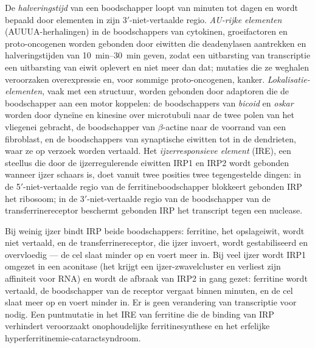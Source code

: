 \begin{definition}\label{def:b3:rna-regulation:stability}
De \emph{halveringstijd} van een boodschapper loopt van minuten tot
dagen en wordt bepaald door elementen in zijn 3$'$-niet-vertaalde
regio. \emph{AU-rijke elementen} (AUUUA-herhalingen) in de
boodschappers van cytokinen, groeifactoren en proto-oncogenen worden
gebonden door eiwitten die deadenylasen aantrekken en halveringstijden
van \qtyrange{10}{30}{min} geven, zodat een uitbarsting van
transcriptie een uitbarsting van eiwit oplevert en niet meer dan dat;
mutaties die ze weghalen veroorzaken overexpressie en, voor sommige
proto-oncogenen, kanker. \emph{Lokalisatie-elementen}, vaak met een
structuur, worden gebonden door adaptoren die de boodschapper aan een
motor koppelen: de boodschappers van \emph{bicoid} en \emph{oskar}
worden door dyneïne en kinesine over microtubuli naar de twee polen
van het vliegenei gebracht, de boodschapper van $\beta$-actine naar de
voorrand van een fibroblast, en de boodschappers van synaptische
eiwitten tot in de dendrieten, waar ze op verzoek worden vertaald. Het
\emph{ijzerresponsieve element} (IRE), een steellus die door de
ijzerregulerende eiwitten IRP1 en IRP2 wordt gebonden wanneer ijzer
schaars is, doet vanuit twee posities twee tegengestelde dingen: in de
5$'$-niet-vertaalde regio van de ferritineboodschapper blokkeert
gebonden IRP het ribosoom; in de 3$'$-niet-vertaalde regio van de
boodschapper van de transferrinereceptor beschermt gebonden IRP het
transcript tegen een nuclease.
\end{definition}

\begin{example}\label{ex:b3:rna-regulation:iron}
Bij weinig ijzer bindt IRP beide boodschappers: ferritine, het
opslageiwit, wordt niet vertaald, en de transferrinereceptor, die
ijzer invoert, wordt gestabiliseerd en overvloedig --- de cel slaat
minder op en voert meer in. Bij veel ijzer wordt IRP1 omgezet in een
aconitase (het krijgt een ijzer-zwavelcluster en verliest zijn
affiniteit voor RNA) en wordt de afbraak van IRP2 in gang gezet:
ferritine wordt vertaald, de boodschapper van de receptor vergaat
binnen minuten, en de cel slaat meer op en voert minder in. Er is geen
verandering van transcriptie voor nodig. Een puntmutatie in het IRE
van ferritine die de binding van IRP verhindert veroorzaakt
onophoudelijke ferritinesynthese en het erfelijke
hyperferritinemie-cataractsyndroom.
\end{example}

